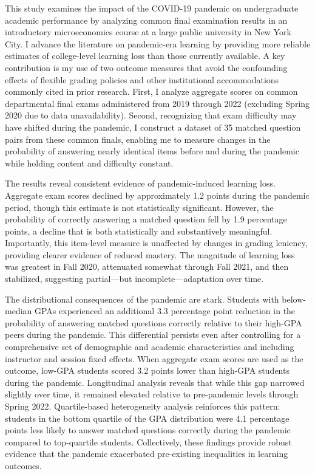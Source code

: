 \documentclass[
  12pt,
  letterpaper,
  DIV=11,
  numbers=noendperiod]{scrartcl}
\begin{document}
This study examines the impact of the COVID-19 pandemic on undergraduate
academic performance by analyzing common final examination results in an
introductory microeconomics course at a large public university in New
York City. I advance the literature on pandemic-era learning by
providing more reliable estimates of college-level learning loss than
those currently available. A key contribution is my use of two outcome
measures that avoid the confounding effects of flexible grading policies
and other institutional accommodations commonly cited in prior research.
First, I analyze aggregate scores on common departmental final exams
administered from 2019 through 2022 (excluding Spring 2020 due to data
unavailability). Second, recognizing that exam difficulty may have
shifted during the pandemic, I construct a dataset of 35 matched
question pairs from these common finals, enabling me to measure changes
in the probability of answering nearly identical items before and during
the pandemic while holding content and difficulty constant.

The results reveal consistent evidence of pandemic-induced learning
loss. Aggregate exam scores declined by approximately 1.2 points during
the pandemic period, though this estimate is not statistically
significant. However, the probability of correctly answering a matched
question fell by 1.9 percentage points, a decline that is both
statistically and substantively meaningful. Importantly, this item-level
measure is unaffected by changes in grading leniency, providing clearer
evidence of reduced mastery. The magnitude of learning loss was greatest
in Fall 2020, attenuated somewhat through Fall 2021, and then
stabilized, suggesting partial---but incomplete---adaptation over time.

The distributional consequences of the pandemic are stark. Students with
below-median GPAs experienced an additional 3.3 percentage point
reduction in the probability of answering matched questions correctly
relative to their high-GPA peers during the pandemic. This differential
persists even after controlling for a comprehensive set of demographic
and academic characteristics and including instructor and session fixed
effects. When aggregate exam scores are used as the outcome, low-GPA
students scored 3.2 points lower than high-GPA students during the
pandemic. Longitudinal analysis reveals that while this gap narrowed
slightly over time, it remained elevated relative to pre-pandemic levels
through Spring 2022. Quartile-based heterogeneity analysis reinforces
this pattern: students in the bottom quartile of the GPA distribution
were 4.1 percentage points less likely to answer matched questions
correctly during the pandemic compared to top-quartile students.
Collectively, these findings provide robust evidence that the pandemic
exacerbated pre-existing inequalities in learning outcomes.
\end{document}
